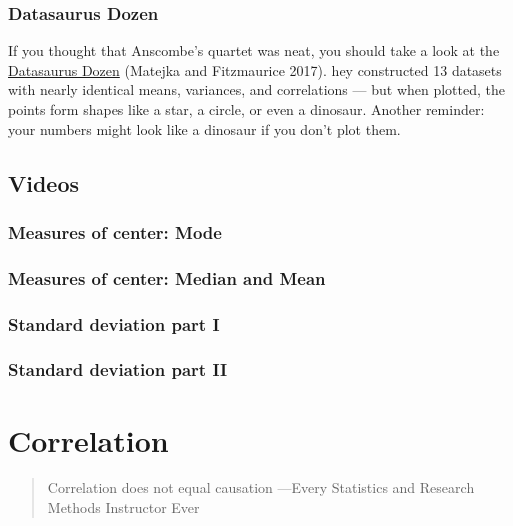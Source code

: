 \documentclass[
  letterpaper,
  DIV=11,
  numbers=noendperiod]{scrreprt}
\begin{document}
\subsection{Datasaurus Dozen}\label{datasaurus-dozen}

If you thought that Anscombe's quartet was neat, you should take a look
at the
\href{https://www.autodeskresearch.com/publications/samestats}{Datasaurus
Dozen} (Matejka and Fitzmaurice 2017). hey constructed 13 datasets with
nearly identical means, variances, and correlations --- but when
plotted, the points form shapes like a star, a circle, or even a
dinosaur. Another reminder: your numbers might look like a dinosaur if
you don't plot them.

\section{Videos}\label{videos-1}

\subsection{Measures of center: Mode}\label{measures-of-center-mode}

\subsection{Measures of center: Median and
Mean}\label{measures-of-center-median-and-mean}

\subsection{Standard deviation part I}\label{standard-deviation-part-i}

\subsection{Standard deviation part
II}\label{standard-deviation-part-ii}


\chapter{Correlation}\label{Correlation}

\begin{quote}
Correlation does not equal causation ---Every Statistics and Research
Methods Instructor Ever
\end{quote}
\end{document}
